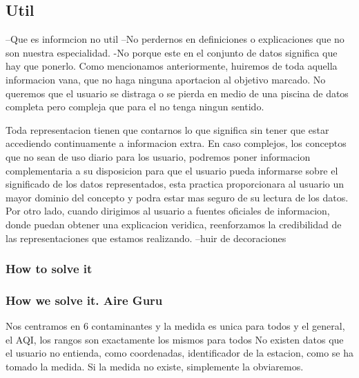 \subsection{Util}
--Que es informcion no util
--No perdernos en definiciones o explicaciones que no son nuestra especialidad.
-No porque este en el conjunto de datos significa que hay que ponerlo.
Como mencionamos anteriormente, huiremos de toda aquella informacion vana, que no haga ninguna aportacion
al objetivo marcado. No queremos que el usuario se distraga o se pierda en medio de una piscina de datos completa
pero compleja que para el no tenga ningun sentido.

Toda representacion tienen que contarnos lo que significa sin tener que estar accediendo continuamente a informacion
extra.
En caso complejos, los conceptos que no sean de uso diario para los usuario, podremos poner informacion
complementaria a su disposicion para que el usuario pueda informarse sobre el significado de los datos 
representados, esta practica proporcionara al usuario un mayor dominio del concepto y podra estar mas
seguro de su lectura de los datos.
Por otro lado, cuando dirigimos al usuario a fuentes oficiales de informacion, donde puedan obtener una explicacion veridica,
reenforzamos la credibilidad de las representaciones que estamos realizando.
--huir de decoraciones

\subsubsection{How to solve it} 


\subsubsection{How we solve it. Aire Guru} 
 Nos centramos en 6 contaminantes y la medida es unica para todos y el general, el AQI, los rangos son exactamente
 los mismos para todos
 No existen datos que el usuario no entienda, como coordenadas, identificador de la estacion, como se ha tomado la medida.
 Si la medida no existe, simplemente la obviaremos.

\begin{itemize}
    \done
    \crossed
    
\end{itemize}
 \newpage